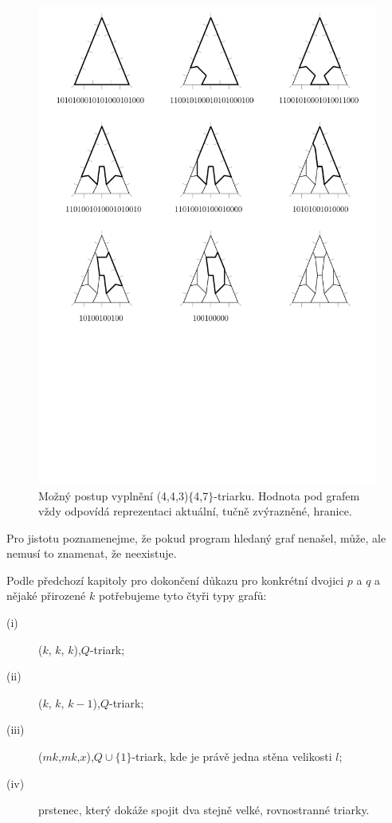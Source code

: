\begin{figure}[h!]\centering
\includegraphics[width=\textwidth]{../img/reseni}
\caption{Možný postup vyplnění (4,4,3)$\lbrace$4,7$\rbrace$-triarku. Hodnota pod grafem vždy odpovídá reprezentaci aktuální, tučně zvýrazněné, hranice.}
\label{obr03:reseni}
\end{figure}

Pro jistotu poznamenejme, že pokud program hledaný graf nenašel, může, ale nemusí to znamenat, že neexistuje.

Podle předchozí kapitoly pro dokončení důkazu pro konkrétní dvojici $p$ a $q$ a nějaké přirozené $k$ potřebujeme tyto čtyři typy grafů:
\begin{description}
\item[(i)] ($k$, $k$, $k$),$Q$-triark;
\item[(ii)] ($k$, $k$, $k-1$),$Q$-triark;
\item[(iii)] ($mk$,$mk$,$x$),$Q\cup \lbrace 1\rbrace$-triark, kde je právě jedna stěna velikosti $l$;
\item[(iv)] prstenec, který dokáže spojit dva stejně velké, rovnostranné triarky.
\end{description}

